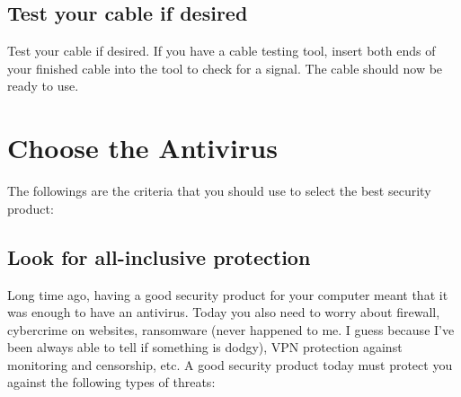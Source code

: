 \documentclass[a4paper,12pt]{book}
\begin{document}
\subsection{Test your cable if desired}
Test your cable if desired. If you have a cable testing tool, insert both ends of your finished cable into the tool to check for a signal. The cable should now be ready to use.

\section{Choose the Antivirus}
The followings are the criteria that you should use to select the best security product:

\subsection{Look for all-inclusive protection}
Long time ago, having a good security product for your computer meant that it was enough to have an antivirus. Today you also need to worry about firewall, cybercrime on websites, ransomware (never happened to me. I guess because I've been always able to tell if something is dodgy), VPN protection against monitoring and censorship, etc.
A good security product today must protect you against the following types of threats:
\end{document}
